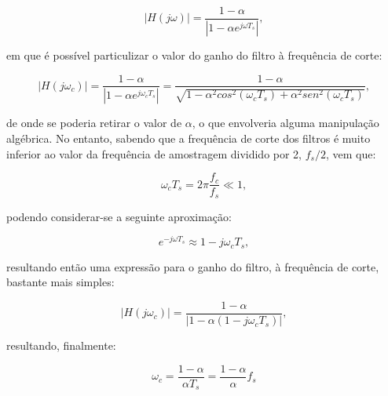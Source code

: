 \documentclass[11pt]{article}
\numberwithin{equation}{section}
\begin{document}
\vspace{-3mm}
\begin{equation}
	|H(j\omega)| = \frac{1-\alpha}{|1-\alpha e^{j\omega T_s}|},
\end{equation} 

\vspace{1mm}
em que é possível particulizar o valor do ganho do filtro à frequência de corte:

\vspace{-3mm}
\begin{equation}
	|H(j\omega_c)| = \frac{1-\alpha}{|1-\alpha e^{j\omega_c T_s}|} = \frac{1 - \alpha}{\sqrt{1- \alpha^2 cos^2{(\omega_c T_s)} + \alpha^2 sen^2{(\omega_c T_s)}}},
\end{equation} 

\vspace{1mm}
de onde se poderia retirar o valor de $\alpha$, o que envolveria alguma manipulação algébrica. No entanto, sabendo que a frequência de corte dos filtros é muito inferior ao valor da frequência de amostragem dividido por 2, $f_s/2$, vem que:

\vspace{-3mm}
\begin{equation}
\omega_ c T_s = 2\pi \frac{f_c}{f_s} \ll 1,
\end{equation} 

\vspace{1mm}
podendo considerar-se a seguinte aproximação:

\vspace{-3mm}
\begin{equation}
e^{-j\omega T_s} \approx 1 - j\omega_c T_s,
\end{equation} 

\vspace{1mm}
resultando então uma expressão para o ganho do filtro, à frequência de corte, bastante mais simples:

\vspace{-3mm}
\begin{equation}
|H(j\omega_c)| =  \frac{1 - \alpha}{|1-\alpha(1-j\omega_c T_s)|},
\end{equation} 

\vspace{1mm}
resultando, finalmente:

\vspace{-3mm}
\begin{equation}
\omega_c = \frac{1 - \alpha}{\alpha T_s} = \frac{1 - \alpha}{\alpha} f_s
\label{eq:alfa}
\end{equation} 
\end{document}
